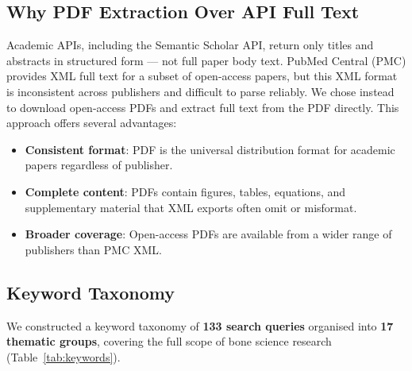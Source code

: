 \documentclass[12pt, a4paper]{article}
\begin{document}
\subsection{Why PDF Extraction Over API Full Text}

Academic APIs, including the Semantic Scholar API, return only titles and abstracts
in structured form --- not full paper body text. PubMed Central (PMC) provides
XML full text for a subset of open-access papers, but this XML format is
inconsistent across publishers and difficult to parse reliably. We chose instead
to download open-access PDFs and extract full text from the PDF directly.
This approach offers several advantages:

\begin{itemize}
    \item \textbf{Consistent format}: PDF is the universal distribution format
          for academic papers regardless of publisher.
    \item \textbf{Complete content}: PDFs contain figures, tables, equations,
          and supplementary material that XML exports often omit or misformat.
    \item \textbf{Broader coverage}: Open-access PDFs are available from a wider
          range of publishers than PMC XML.
\end{itemize}

\subsection{Keyword Taxonomy}

We constructed a keyword taxonomy of \textbf{133 search queries} organised into
\textbf{17 thematic groups}, covering the full scope of bone science research
(Table~\ref{tab:keywords}).
\end{document}
